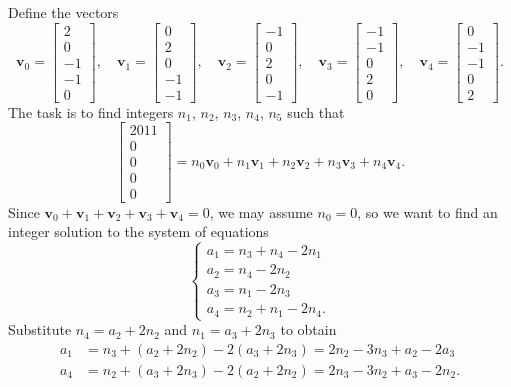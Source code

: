 Define the vectors \[\mathbf v_0=\begin{bmatrix}2\\0\\-1\\-1\\0\end{bmatrix},\quad\mathbf v_1=\begin{bmatrix}0\\2\\0\\-1\\-1\end{bmatrix},\quad\mathbf v_2=\begin{bmatrix}-1\\0\\2\\0\\-1\end{bmatrix},\quad\mathbf v_3=\begin{bmatrix}-1\\-1\\0\\2\\0\end{bmatrix},\quad\mathbf v_4=\begin{bmatrix}0\\-1\\-1\\0\\2\end{bmatrix}.\]
The task is to find integers $n_1$, $n_2$, $n_3$, $n_4$, $n_5$ such that \[\begin{bmatrix}2011\\0\\0\\0\\0\end{bmatrix}=n_0\mathbf v_0+n_1\mathbf v_1+n_2\mathbf v_2+n_3\mathbf v_3+n_4\mathbf v_4.\]
Since $\mathbf v_0+\mathbf v_1+\mathbf v_2+\mathbf v_3+\mathbf v_4=0$, we may assume $n_0=0$, so we want to find an integer solution to the system of equations
\[
    \begin{cases}
        a_1=n_3+n_4-2n_1\\
        a_2=n_4-2n_2\\
        a_3=n_1-2n_3\\
        a_4=n_2+n_1-2n_4.
    \end{cases}
\]
Substitute $n_4=a_2+2n_2$ and $n_1=a_3+2n_3$ to obtain
\begin{align*}
    a_1&=n_3+(a_2+2n_2)-2(a_3+2n_3)=2n_2-3n_3+a_2-2a_3\\
    a_4&=n_2+(a_3+2n_3)-2(a_2+2n_2)=2n_3-3n_2+a_3-2n_2.
\end{align*}
